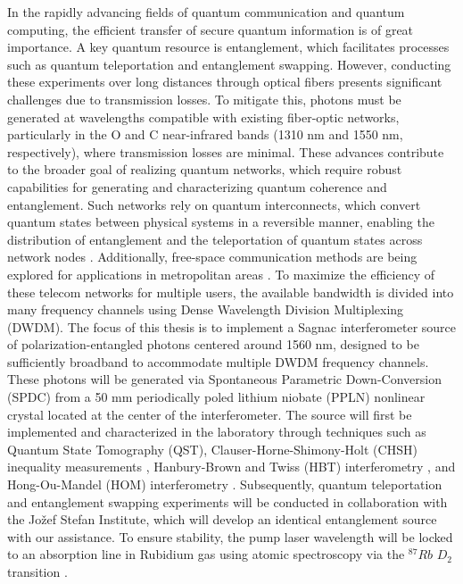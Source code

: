 \documentclass{article}
\theoremstyle{mytheoremstyle}
\theoremstyle{mytheoremstyle}
\theoremstyle{myproblemstyle}
\begin{document}
In the rapidly advancing fields of quantum communication and quantum computing, the efficient transfer of secure quantum information is of great importance.
A key quantum resource is entanglement, which facilitates processes such as quantum teleportation and entanglement swapping.
However, conducting these experiments over long distances through optical fibers presents significant challenges due to transmission losses. To mitigate this,
photons must be generated at wavelengths compatible with existing fiber-optic networks,
particularly in the O and C near-infrared bands (1310 nm and 1550 nm, respectively), where transmission losses are minimal.
These advances contribute to the broader goal of realizing quantum networks,
which require robust capabilities for generating and characterizing quantum coherence and entanglement.
Such networks rely on quantum interconnects, which convert quantum states between physical systems in a reversible manner,
enabling the distribution of entanglement and the teleportation of quantum states across network nodes \cite{Kimble_2008}.
Additionally, free-space communication methods are being explored for applications in metropolitan areas \cite{Kržić_et_al_2023}.
To maximize the efficiency of these telecom networks for multiple users,
the available bandwidth is divided into many frequency channels using Dense Wavelength Division Multiplexing (DWDM).
The focus of this thesis is to implement a Sagnac interferometer source of polarization-entangled photons centered around 1560 nm,
designed to be sufficiently broadband to accommodate multiple DWDM frequency channels.
These photons will be generated via Spontaneous Parametric Down-Conversion \cite{jesseSPDC} (SPDC) from a
50 mm periodically poled lithium niobate (PPLN) nonlinear crystal located at the center of the interferometer.
The source will first be implemented and characterized in the laboratory through techniques such as Quantum State Tomography (QST),
Clauser-Horne-Shimony-Holt (CHSH) inequality measurements \cite{Clauser_Horne_Shimony_Holt_1969},
Hanbury-Brown and Twiss (HBT) interferometry \cite{Brown_Twiss_1954}, and Hong-Ou-Mandel (HOM) interferometry \cite{Hong_Ou_Mandel_1987}.
Subsequently, quantum teleportation \cite{Bouwmeester_Pan_Mattle_Eibl_Weinfurter_Zeilinger_1997}
and entanglement swapping \cite{Jennewein_Weihs_Pan_Zeilinger_2001} experiments will be conducted in collaboration with the Jožef Stefan Institute,
which will develop an identical entanglement source with our assistance. To ensure stability,
the pump laser wavelength will be locked to an absorption line in Rubidium gas using atomic spectroscopy via the $^{87}Rb$ $D_2$ transition \cite{metger2017sas}.
\end{document}
